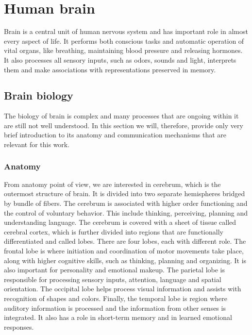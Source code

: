 \chapter{Human brain}
Brain is a central unit of human nervous system and has important role in almost
every aspect of life. It performs both conscious tasks and automatic operation
of vital organs, like breathing, maintaining blood pressure and releasing
hormones. It also processes all sensory inputs, such as odors, sounds and light,
interprets them and make associations with representations preserved in memory.
\section{Brain biology}
The biology of brain is complex and many processes that are ongoing within it
are still not well understood. In this section we will, therefore, provide only
very brief introduction to its anatomy and communication mechanisms that are
relevant for this work.
\subsection{Anatomy}
From anatomy point of view, we are interested in cerebrum, which is the
outermost structure of brain. It is divided into two separate hemispheres
bridged by bundle of fibers. The cerebrum is associated with higher order
functioning and the control of voluntary behavior. This include thinking,
perceiving, planning and understanding language. The cerebrum is covered with a
sheet of tissue called cerebral cortex, which is further divided into regions
that are functionally differentiated and called lobes. There are four lobes,
each with different role. The frontal lobe is where initiation and coordination
of motor movements take place, along with higher cognitive skills, such as
thinking, planning and organizing. It is also important for personality and
emotional makeup. The parietal lobe is responsible for processing sensory
inputs, attention, language and spatial orientation. The occipital lobe helps
process visual information and assists with recognition of shapes and colors.
Finally, the temporal lobe is region where auditory information is processed and
the information from other senses is integrated. It also has a role in
short-term memory and in learned emotional responses. \cite{brainFacts}

